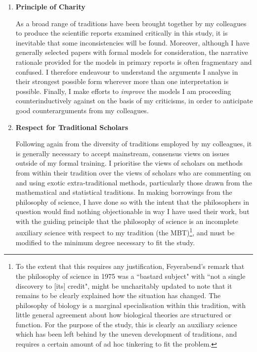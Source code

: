 \begin{enumerate}
\item \textbf{Principle of Charity}

As a broad range of traditions have been brought together by my colleagues to produce the scientific reports examined critically in this study, it is inevitable that some inconsistencies will be found. Moreover, although I have generally selected papers with formal models for consideration, the narrative rationale provided for the models in primary reports is often fragmentary and confused. I therefore endeavour to understand the arguments I analyse in their strongest possible form wherever more than one interpretation is possible. Finally, I make efforts to \textit{improve} the models I am proceeding counterinductively against on the basis of my criticisms, in order to anticipate good counterarguments from my colleagues.

\item \textbf{Respect for Traditional Scholars}

Following again from the diversity of traditions employed by my colleagues, it is generally necessary to accept mainstream, consensus views on issues outside of my formal training. I prioritise the views of scholars on methods from within their tradition over the views of scholars who are commenting on and using exotic extra-traditional methods, particularly those drawn from the mathematical and statistical traditions. In making borrowings from the philosophy of science, I have done so with the intent that the philosophers in question would find nothing objectionable in way I have used their work, but with the guiding principle that the philosophy of science is an incomplete auxiliary science with respect to my tradition (the MBT)\footnote{To the extent that this requires any justification, Feyerabend's remark that the philosophy of science in 1975 was a ``bastard subject" with ``not a single discovery to [its] credit", might be uncharitably updated to note that it remains to be clearly explained how the situation has changed. The philosophy of biology is a marginal specialisation within this tradition, with little general agreement about how biological theories are structured or function. For the purpose of the study, this is clearly an auxiliary science which has been left behind by the uneven development of traditions, and requires a certain amount of ad hoc tinkering to fit the problem.}, and must be modified to the minimum degree necessary to fit the study.


\end{enumerate}
